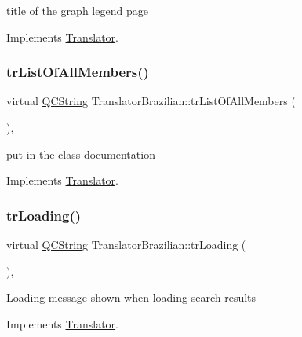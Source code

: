 title of the graph legend page 

Implements \mbox{\hyperlink{class_translator}{Translator}}.

\mbox{\label{class_translator_brazilian_af27a60e116a0889f4e2f65e061b793c9}} 
\subsubsection{\texorpdfstring{trListOfAllMembers()}{trListOfAllMembers()}}
{\footnotesize\ttfamily virtual \mbox{\hyperlink{class_q_c_string}{Q\+C\+String}} Translator\+Brazilian\+::tr\+List\+Of\+All\+Members (\begin{DoxyParamCaption}{ }\end{DoxyParamCaption})\hspace{0.3cm}{\ttfamily [inline]}, {\ttfamily [virtual]}}

put in the class documentation 

Implements \mbox{\hyperlink{class_translator}{Translator}}.

\mbox{\label{class_translator_brazilian_ac497f6145c87e2bd6a2f2d45f1196a4b}} 
\subsubsection{\texorpdfstring{trLoading()}{trLoading()}}
{\footnotesize\ttfamily virtual \mbox{\hyperlink{class_q_c_string}{Q\+C\+String}} Translator\+Brazilian\+::tr\+Loading (\begin{DoxyParamCaption}{ }\end{DoxyParamCaption})\hspace{0.3cm}{\ttfamily [inline]}, {\ttfamily [virtual]}}

Loading message shown when loading search results 

Implements \mbox{\hyperlink{class_translator}{Translator}}.

\mbox{\label{class_translator_brazilian_a90145f98f01c768b66ca6d3a253fcaa6}} 

